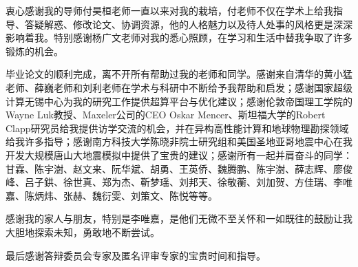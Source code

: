 \begin{acknowledgement}

衷心感谢我的导师付昊桓老师一直以来对我的栽培，付老师不仅在学术上给我指导、答疑解惑、修改论文、协调资源，他的人格魅力以及待人处事的风格更是深深影响着我。特别感谢杨广文老师对我的悉心照顾，在学习和生活中替我争取了许多锻炼的机会。

毕业论文的顺利完成，离不开所有帮助过我的老师和同学。感谢来自清华的黄小猛老师、薛巍老师和刘利老师在学术与科研中不断给予我帮助和启发；感谢国家超级计算无锡中心为我的研究工作提供超算平台与优化建议；感谢伦敦帝国理工学院的Wayne Luk教授、Maxeler公司的CEO Oskar Mencer、斯坦福大学的Robert Clapp研究员给我提供访学交流的机会，并在异构高性能计算和地球物理勘探领域给我许多指导；感谢南方科技大学陈晓非院士研究组和美国圣地亚哥地震中心在我开发大规模唐山大地震模拟中提供了宝贵的建议；感谢所有一起并肩奋斗的同学：甘霖、陈宇澍、赵文来、阮华斌、胡勇、王英侨、魏腾鹏、陈宇澍、薛志辉、廖俊峰、吕子鉷、徐世真、郑为杰、靳梦瑶、刘邦天、徐敬蘅、刘加贺、方佳瑞、李唯嘉、陈炳炜、张赫、魏衍雯、刘策文、陈悦等等。

感谢我的家人与朋友，特别是李唯嘉，是他们无微不至关怀和一如既往的鼓励让我大胆地探索未知，勇敢地不断尝试。

最后感谢答辩委员会专家及匿名评审专家的宝贵时间和指导。
\end{acknowledgement}
